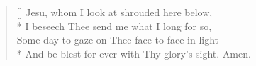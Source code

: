 \begin{verse}[\versewidth]
         Jesu, whom I look at shrouded here below,        \\*
       I beseech Thee send me what I long for so,       \\  %
      Some day to gaze on Thee face to face in light      \\*
    And be blest for ever with Thy glory's sight. Amen.   
 
 \end{verse}
 
 
